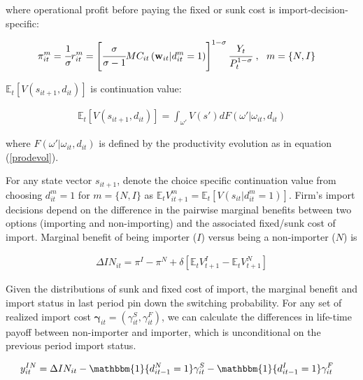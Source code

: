 \documentclass[11pt,letter]{article}
\newcommand{\vect}[1]{\boldsymbol{\mathbf{#1}}}
\newcommand{\Ind}[1]{\mathbbm{1}\{{#1}\}}
\newcommand{\prn}[1]{\left({#1}\right)}
\newcommand{\mprn}[1]{\{{#1}\}}
\newcommand{\lprn}[1]{\left[{#1}\right]}
\newcommand{\cf}[2]{\cfrac{#1}{#2}}
\begin{document}
\begin{appendices}
\noindent where operational profit before paying the fixed or sunk cost is import-decision-specific:

\begin{align}
\pi_{it}^m &= \cf{1}{\sigma}r_{it}^m =  \lprn{\cf{\sigma}{\sigma-1}MC_{it}\prn{\vect{w}_{it}|d_{it}^m=1}}^{1-\sigma}\cf{Y_t}{P_t^{1-\sigma}}\ ,\ \  m=\mprn{N,I}
\end{align}

\noindent $ \mathbb{E}_t \lprn{V(s_{it+1},d_{it})}$ is continuation value:

\begin{align}
 \mathbb{E}_t \lprn{V(s_{it+1},d_{it})} = \int_{\omega'} V(s')dF(\omega'|\omega_{it},d_{it}) \label{contvalue}
\end{align}

\noindent where $F(\omega'|\omega_{it},d_{it})$ is defined by the productivity evolution as in equation (\ref{prodevol}). 


For any state vector $s_{it+1}$, denote  the choice specific continuation value from choosing $d_{it}^m=1$ for $m=\mprn{N,I}$ as $\mathbb{E}_tV_{it+1}^m = \mathbb{E}_t\lprn{V(s_{it}|d_{it}^m=1)}$. Firm's import decisions depend on the difference in the pairwise marginal benefits between two options (importing and non-importing) and the associated fixed/sunk cost of import. Marginal benefit of being importer ($I$) versus being a non-importer ($N$) is

\begin{align}
\Delta IN_{it} = \pi^I - \pi^N + \delta\lprn{\mathbb{E}_t {V_{t+1}^I} - \mathbb{E}_t {V_{t+1}^N}} 
\end{align}

Given the distributions of sunk and fixed cost of import, the marginal benefit and import status in last period pin down the switching probability. For any set of realized import cost $\vect{\gamma}_{it}=\prn{\gamma_{it}^S,\gamma_{it}^F}$, we can calculate the differences in life-time payoff between non-importer and importer, which is unconditional on the previous period import status.

\begin{align}
y_{it}^{IN} &= \Delta IN_{it} -\Ind{d_{it-1}^N=1}\gamma_{it}^S  - \Ind{d_{it-1}^I=1}\gamma_{it}^F 
\end{align}



\end{appendices}
\end{document}
